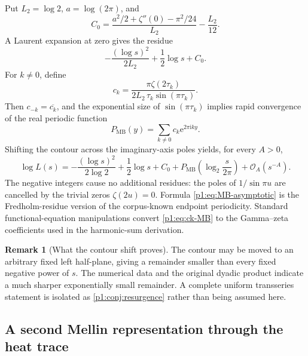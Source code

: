 \documentclass[11pt,oneside]{article}
\theoremstyle{definition}
\newtheorem{remark}[theorem]{Remark}
\newcommand{\e}{\mathrm e}
\newcommand{\ii}{\mathrm i}
\newcommand{\bigO}{\mathcal O}
\begin{document}
Put \(L_2=\log2\), \(a=\log(2\pi)\), and
\begin{equation}
 C_0=\frac{a^2/2+\zeta''(0)-\pi^2/24}{L_2}-\frac{L_2}{12}.
 \label{p1:eq:C0}
\end{equation}
A Laurent expansion at zero gives the residue
\begin{equation}
 -\frac{(\log s)^2}{2L_2}+\frac12\log s+C_0.
 \label{p1:eq:zero-residue}
\end{equation}
For \(k\ne0\), define
\begin{equation}
 c_k=\frac{\pi\zeta(2\tau_k)}
 {2L_2\,\tau_k\sin(\pi\tau_k)}.
 \label{p1:eq:ck-MB}
\end{equation}
Then \(c_{-k}=\overline{c_k}\), and the exponential size of
\(\sin(\pi\tau_k)\) implies rapid convergence of the real periodic function
\begin{equation}
 P_{\mathrm{MB}}(y)=\sum_{k\ne0}c_k\e^{2\pi\ii ky}.
 \label{p1:eq:P-MB}
\end{equation}
Shifting the contour across the imaginary-axis poles yields, for every \(A>0\),
\begin{equation}
 \boxed{\quad
 \log L(s)=-\frac{(\log s)^2}{2\log2}+\frac12\log s+C_0
 +P_{\mathrm{MB}}\!\left(\log_2\frac{s}{2\pi}\right)
 +\bigO_A(s^{-A}).
 \quad}
 \label{p1:eq:MB-asymptotic}
\end{equation}
The negative integers cause no additional residues: the poles of
\(1/\sin\pi u\) are cancelled by the trivial zeros \(\zeta(2u)=0\).  Formula
\eqref{p1:eq:MB-asymptotic} is the Fredholm-residue version of the corpus-known endpoint
periodicity.  Standard functional-equation manipulations convert
\eqref{p1:eq:ck-MB} to the Gamma--zeta coefficients used in the harmonic-sum derivation.

\begin{remark}[What the contour shift proves]
The contour may be moved to an arbitrary fixed left half-plane, giving a remainder
smaller than every fixed negative power of \(s\).  The numerical data and the original
dyadic product indicate a much sharper exponentially small remainder.  A complete
uniform transseries statement is isolated as \cref{p1:conj:resurgence} rather than being
assumed here.
\end{remark}

\subsection{A second Mellin representation through the heat trace}
\end{document}
